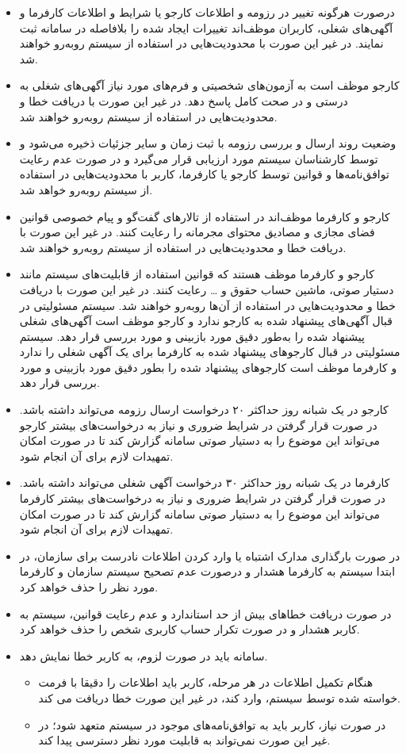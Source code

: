 \documentclass[12pt]{article}
\begin{document}
\begin{itemize}
		\item
		در‌صورت هرگونه تغییر در رزومه و اطلاعات کارجو یا شرایط و اطلاعات کارفرما و آگهی‌های شغلی، کاربران موظف‌اند تغییرات ایجاد شده را بلافاصله در سامانه ثبت نمایند. در غیر این صورت با محدودیت‌هایی در استفاده از سیستم روبه‌رو خواهند شد.
		\item
		کارجو موظف است به آزمون‌های شخصیتی و فرم‌های مورد نیاز آگهی‌های شغلی به درستی و در صحت کامل پاسخ دهد. در غیر این صورت با دریافت خطا و محدودیت‌هایی در استفاده از سیستم روبه‌رو خواهند شد.
		\item
		وضعیت روند ارسال و بررسی رزومه با ثبت زمان و سایر جزئیات ذخیره می‌شود و توسط کارشناسان سیستم مورد ارزیابی قرار می‌گیرد و در صورت عدم رعایت توافق‌نامه‌ها و قوانین توسط کارجو یا کارفرما، کاربر با محدودیت‌هایی در استفاده از سیستم روبه‌رو خواهد شد.
		\item
		کارجو و کارفرما موظف‌اند در استفاده از تالارهای گفت‌گو و پیام خصوصی قوانین فضای مجازی و مصادیق محتوای مجرمانه را رعایت کنند. در غیر این صورت با دریافت خطا و محدودیت‌هایی در استفاده از سیستم روبه‌‌رو خواهند شد.
		\item
		کارجو و کارفرما موظف هستند که قوانین استفاده از قابلیت‌های سیستم مانند دستیار صوتی، ماشین حساب حقوق و … رعایت کنند. در غیر این صورت با دریافت خطا و محدودیت‌هایی در استفاده از آن‌ها روبه‌رو خواهند شد.
		سیستم مسئولیتی در قبال آگهی‌های پیشنهاد شده به کارجو ندارد و کارجو موظف است آگهی‌های شغلی پیشنهاد شده را به‌طور دقیق مورد بازبینی و مورد بررسی قرار دهد.
		سیستم مسئولیتی در قبال کارجو‌های پیشنهاد شده به کارفرما برای یک آگهی شغلی را ندارد و کارفرما موظف است کارجو‌های پیشنهاد شده را بطور دقیق مورد بازبینی و مورد بررسی قرار دهد.
		\item
		کارجو در یک شبانه روز حداکثر ۲۰ درخواست ارسال رزومه می‌تواند داشته باشد. در‌ صورت قرار گرفتن در شرایط ضروری و نیاز به درخواست‌های بیشتر کارجو می‌تواند این موضوع را به دستیار صوتی سامانه گزارش کند تا در صورت امکان تمهیدات لازم برای آن انجام شود.
		\item
		کارفرما در یک شبانه روز حداکثر ۳۰ درخواست آگهی شغلی می‌تواند داشته باشد. در‌ صورت قرار گرفتن در شرایط ضروری و نیاز به درخواست‌های بیشتر کارفرما می‌تواند این موضوع را به دستیار صوتی سامانه گزارش کند تا در صورت امکان تمهیدات لازم برای آن انجام شود.
		\item
		در‌ صورت بارگذاری مدارک اشتباه یا وارد کردن اطلاعات نادرست برای سازمان، در ابتدا سیستم به کارفرما هشدار و درصورت عدم تصحیح سیستم سازمان و کارفرما مورد‌ نظر را حذف خواهد کرد.
		\item
		در صورت دریافت خطاهای بیش از حد استاندارد و عدم رعایت قوانین، سیستم به کاربر هشدار و در‌ صورت تکرار حساب کاربری شخص را حذف خواهد کرد.
		\item
		سامانه باید در صورت لزوم، به کاربر خطا نمایش دهد.
		\begin{itemize}
			\item
			هنگام تکمیل اطلاعات در هر مرحله، کاربر باید اطلاعات را دقیقا با فرمت خواسته شده توسط سیستم، وارد کند، در غیر این صورت خطا دریافت می کند.
			\item
			در صورت نیاز، کاربر باید به توافق‌نامه‌های موجود در سیستم متعهد شود؛ در غیر این صورت نمی‌تواند به قابلیت مورد نظر دسترسی پیدا کند.
		\end{itemize}
	\end{itemize}
\end{document}

